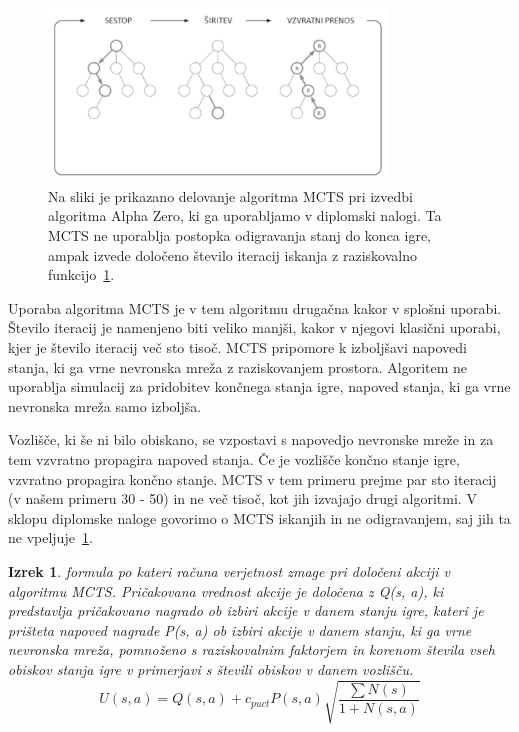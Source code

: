 \documentclass[a4paper, 12pt]{book}
\newtheorem{izrek}{Izrek}[chapter]
\begin{document}
\begin{figure}[h]
	\begin{center}
		\includegraphics[width=0.8\textwidth]{photos/modifiedMCTS.pdf}
	\end{center}
	\caption{Na sliki je prikazano delovanje algoritma MCTS pri izvedbi algoritma Alpha Zero, ki ga uporabljamo v diplomski nalogi. Ta MCTS ne uporablja postopka odigravanja stanj do konca igre, ampak izvede določeno število iteracij iskanja z raziskovalno funkcijo~\ref{iz:1}. }
	\label{modifiedMCTS}
\end{figure}

Uporaba algoritma MCTS je v tem algoritmu drugačna kakor v splošni uporabi.
Število iteracij je namenjeno biti veliko manjši, kakor v njegovi klasični uporabi, kjer je število iteracij več sto tisoč. 
MCTS pripomore k izboljšavi napovedi stanja, ki ga vrne nevronska mreža z raziskovanjem prostora.
Algoritem ne uporablja simulacij za pridobitev končnega stanja igre, napoved stanja, ki ga vrne nevronska mreža samo izboljša.

Vozlišče, ki še ni bilo obiskano, se vzpostavi s napovedjo nevronske mreže in za tem vzvratno propagira napoved stanja.
Če je vozlišče končno stanje igre, vzvratno propagira končno stanje.
MCTS v tem primeru prejme par sto iteracij (v našem primeru 30 - 50) in ne več tisoč, kot jih izvajajo drugi algoritmi.
V sklopu diplomske naloge govorimo o MCTS iskanjih in ne odigravanjem, saj jih ta ne vpeljuje~\ref{modifiedMCTS}.


\begin{izrek}
	\label{iz:1}
	formula po kateri računa verjetnost zmage pri določeni akciji v algoritmu MCTS. Pričakovana vrednost akcije je določena z Q(s, a), ki predstavlja  pričakovano nagrado ob izbiri akcije v danem stanju igre, kateri je prišteta napoved nagrade P(s, a) ob izbiri akcije v danem stanju, ki ga vrne nevronska mreža, pomnoženo s raziskovalnim faktorjem in korenom števila vseh obiskov stanja igre v primerjavi s števili obiskov v danem vozlišču.
	\begin{equation}
	U(s, a) = Q(s, a) + c_{puct}P(s, a)\sqrt{\dfrac{\sum{N(s)}}{1+N(s, a)}}
	\label{eq:mctsFormula}
	\end{equation}
\end{izrek}
\end{document}
